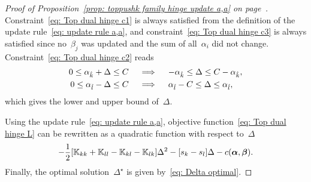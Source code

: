 \topruleaa*
\begin{proof}[Proof of Proposition~\ref{prop: toppushk family hinge update a,a} on page~\pageref{prop: toppushk family hinge update a,a}]
  Constraint~\eqref{eq: Top dual hinge c1} is always satisfied from the definition of the update rule~\eqref{eq: update rule a,a}, and constraint~\eqref{eq: Top dual hinge c3} is always satisfied since no~$\beta_j$ was updated and the sum of all~$\alpha_i$ did not change. Constraint~\eqref{eq: Top dual hinge c2} reads
  \begin{align*}
    0 \leq \alpha_{\hat{k}} + \Delta \leq C
    & \quad \implies \quad
    - \alpha_{\hat{k}} \leq \Delta \leq C - \alpha_{\hat{k}}, \\
    0 \leq \alpha_{\hat{l}} - \Delta \leq C
    & \quad \implies \quad
    \alpha_{\hat{l}} - C \leq \Delta \leq \alpha_{\hat{l}},
  \end{align*}
  which gives the lower and upper bound of~$\Delta.$
  
  Using the update rule~\eqref{eq: update rule a,a}, objective function~\eqref{eq: Top dual hinge L} can be rewritten as a quadratic function with respect to~$\Delta$
  \begin{equation*}
    - \frac{1}{2} \Brac[s]{\K_{kk} + \K_{ll} - \K_{kl} - \K_{lk}} \Delta^2
    - \Brac[s]{s_k - s_l} \Delta
    - c(\bm{\alpha}, \bm{\beta}).
  \end{equation*}
  Finally, the optimal solution~$\Delta^{\star}$ is given by~\eqref{eq: Delta optimal}.
\end{proof}

